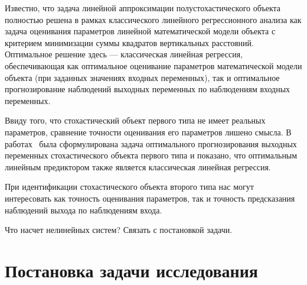 Известно, что задача линейной аппроксимации полустохастического объекта полностью решена в
рамках классического линейного регрессионного анализа как задача оценивания параметров
линейной математической модели объекта с критерием минимизации суммы квадратов вертикальных расстояний.
Оптимальное решение здесь --- классическая линейная регрессия,
обеспечивающая как оптимальное оценивание параметров математической модели объекта
(при заданных значениях входных переменных),
так и оптимальное прогнозирование наблюдений выходных переменных по наблюдениям входных переменных.

Ввиду того, что стохастический объект первого типа не имеет реальных параметров,
сравнение точности оценивания его параметров лишено смысла.
В работах~\cite{mukha_2010, mukha_2011} была сформулирована задача оптимального прогнозирования
выходных переменных стохастического объекта первого типа и показано,
что оптимальным линейным предиктором также является классическая линейная регрессия.

При идентификации стохастического объекта второго типа нас могут интересовать
как точность оценивания параметров, так и точность предсказания наблюдений выхода
по наблюдениям входа.

{\color{red} Что насчет нелинейных систем?}
{\color{red} Связать с постановкой задачи.}

\section{Постановка задачи исследования}



